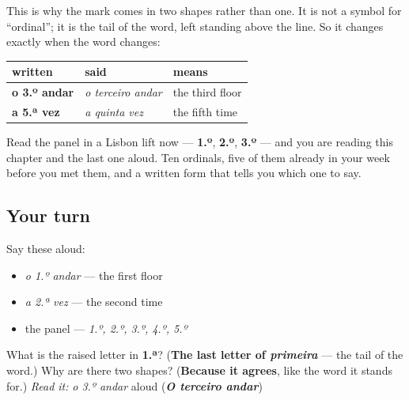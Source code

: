 \begin{grammarlens}[title={What you've built: the mark agrees, because it is a letter}]
This is why the mark comes in two shapes rather than one. It is not a symbol for \textquotedblleft{}ordinal\textquotedblright{}; it is the tail of the word, left standing above the line. So it changes exactly when the word changes:

\noindent
\begin{tabularx}{\linewidth}{@{}>{\raggedright\arraybackslash}X>{\raggedright\arraybackslash}X>{\raggedright\arraybackslash}X@{}}
\toprule
\textbf{written} & \textbf{said} & \textbf{means} \\
\midrule
\textbf{o 3.º andar} & \emph{o terceiro andar} & the third floor \\
\textbf{a 5.ª vez} & \emph{a quinta vez} & the fifth time \\
\bottomrule
\end{tabularx}

Read the panel in a Lisbon lift now — \textbf{1.º}, \textbf{2.º}, \textbf{3.º} — and you are reading this chapter and the last one aloud. Ten ordinals, five of them already in your week before you met them, and a written form that tells you which one to say.
\end{grammarlens}

\subsection*{Your turn}
Say these aloud:

\begin{itemize}
\raggedright
  \item \emph{o 1.º andar} — the first floor
  \item \emph{a 2.ª vez} — the second time
  \item the panel — \emph{1.º, 2.º, 3.º, 4.º, 5.º}
\end{itemize}

\begin{tcolorbox}[breakable,colback=teal!4,colframe=teal!35!black,title={Before you move on}]
What is the raised letter in \textbf{1.ª}? (\textbf{The last letter of \emph{primeira}} — the tail of the word.) Why are there two shapes? (\textbf{Because it agrees}, like the word it stands for.) \emph{Read it:} \emph{o 3.º andar} aloud (\emph{\textbf{O terceiro andar}})
\end{tcolorbox}
